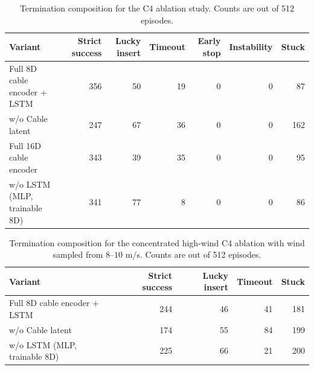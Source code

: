 \documentclass[10pt]{article}
\begin{document}
\begin{table}[t]
\centering
\caption{Termination composition for the C4 ablation study.  Counts are out of 512 episodes.}
\label{tab:formal_interval_ablation_terminations}
\footnotesize
\setlength{\tabcolsep}{5pt}
\begin{tabularx}{\linewidth}{@{}Yrrrrrr@{}}
\toprule
Variant & Strict success & Lucky insert & Timeout & Early stop & Instability & Stuck \\
\midrule
Full 8D cable encoder + LSTM & 356 & 50 & 19 & 0 & 0 & 87 \\
w/o Cable latent & 247 & 67 & 36 & 0 & 0 & 162 \\
Full 16D cable encoder & 343 & 39 & 35 & 0 & 0 & 95 \\
w/o LSTM (MLP, trainable 8D) & 341 & 77 & 8 & 0 & 0 & 86 \\
\bottomrule
\end{tabularx}
\end{table}

\begin{table}[t]
\centering
\caption{Termination composition for the concentrated high-wind C4 ablation with wind sampled from $8$--$10$ m/s.  Counts are out of 512 episodes.}
\label{tab:formal_interval_ablation_wind8to10_terminations}
\footnotesize
\setlength{\tabcolsep}{5pt}
\begin{tabularx}{\linewidth}{@{}Yrrrr@{}}
\toprule
Variant & Strict success & Lucky insert & Timeout & Stuck \\
\midrule
Full 8D cable encoder + LSTM & 244 & 46 & 41 & 181 \\
w/o Cable latent & 174 & 55 & 84 & 199 \\
w/o LSTM (MLP, trainable 8D) & 225 & 66 & 21 & 200 \\
\bottomrule
\end{tabularx}
\end{table}
\end{document}
